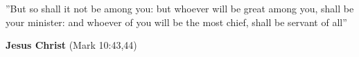 


\vspace*{10cm}

    \vspace*{5cm}
	
    ''But so shall it not be among you: but whoever will be great among you, shall be your minister: and whoever of you will be the most chief, shall be servant of all'' 
  \begin{flushright}
      \textbf{Jesus Christ} (Mark 10:43,44)
  \end{flushright}
	
\newpage